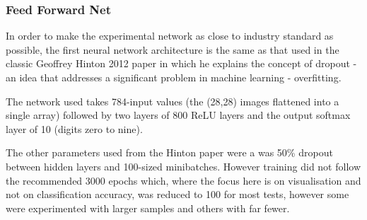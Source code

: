\documentclass[a4paper,11pt,titlepage]{article}
\begin{document}
		\subsubsection{Feed Forward Net}

		In order to make the experimental network as close to industry standard as possible, the first neural network architecture is the same as that used in the classic Geoffrey Hinton 2012 paper in which he explains the concept of dropout \cite{Hinton2012} - an idea that addresses a significant problem in machine learning - overfitting.
	
	\begin{figure}[H]
	\end{figure}

		\par 
		The network used takes 784-input values (the (28,28) images flattened into a single array) followed by two layers of 800 ReLU layers and the output softmax layer of 10 (digits zero to nine). 
		\par 
		The other parameters used from the Hinton paper were a was 50\% dropout between hidden layers and 100-sized minibatches. However training did not follow the recommended 3000 epochs which, where the focus here is on visualisation and not on classification accuracy, was reduced to 100 for most tests, however some were experimented with larger samples and others with far fewer.
		\\\
\end{document}
